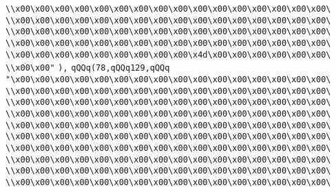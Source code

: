 \verb|\\x00\x00\x00\x00\x00\x00\x00\x00\x00\x00\x00\x00\x00\x00\x00\x00\|\newline
\verb|\\x00\x00\x00\x00\x00\x00\x00\x00\x00\x00\x00\x00\x00\x00\x00\x00\|\newline
\verb|\\x00\x00\x00\x00\x00\x00\x00\x00\x00\x00\x00\x00\x00\x00\x00\x00\|\newline
\verb|\\x00\x00\x00\x00\x00\x00\x00\x00\x00\x00\x00\x00\x00\x00\x00\x00\|\newline
\verb|\\x00\x00\x00\x00\x00\x00\x00\x00\x00\x4d\x00\x00\x00\x00\x00\x00\|\newline
\verb|\\x00\x00"|\newline
\verb|),|\newline
\verb|qQQq(78,qQQq129,qQQq|\newline
\verb|"\x00\x00\x00\x00\x00\x00\x00\x00\x00\x00\x00\x00\x00\x00\x00\x00\|\newline
\verb|\\x00\x00\x00\x00\x00\x00\x00\x00\x00\x00\x00\x00\x00\x00\x00\x00\|\newline
\verb|\\x00\x00\x00\x00\x00\x00\x00\x00\x00\x00\x00\x00\x00\x00\x00\x00\|\newline
\verb|\\x00\x00\x00\x00\x00\x00\x00\x00\x00\x00\x00\x00\x00\x00\x00\x00\|\newline
\verb|\\x00\x00\x00\x00\x00\x00\x00\x00\x00\x00\x00\x00\x00\x00\x00\x00\|\newline
\verb|\\x00\x00\x00\x00\x00\x00\x00\x00\x00\x00\x00\x00\x00\x00\x00\x00\|\newline
\verb|\\x00\x00\x00\x00\x00\x00\x00\x00\x00\x00\x00\x00\x00\x00\x00\x00\|\newline
\verb|\\x00\x00\x00\x00\x00\x00\x00\x00\x00\x00\x00\x00\x00\x00\x00\x00\|\newline
\verb|\\x00\x00\x00\x00\x00\x00\x00\x00\x00\x00\x00\x00\x00\x00\x00\x00\|\newline
\verb|\\x00\x00\x00\x00\x00\x00\x00\x00\x00\x00\x00\x00\x00\x00\x00\x00\|\newline
